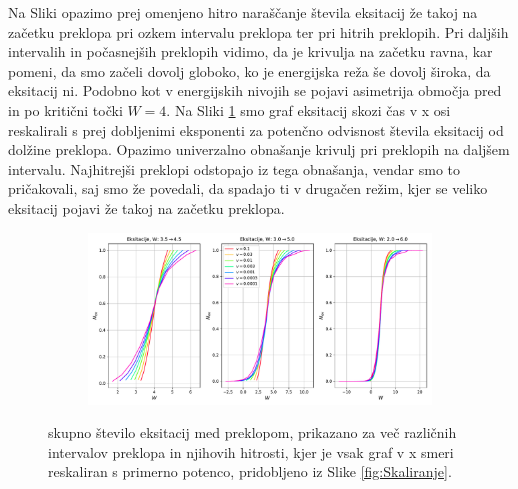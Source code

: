 Na Sliki \label{fig:SkoziCas} opazimo prej omenjeno hitro naraščanje števila eksitacij že takoj na začetku preklopa pri ozkem intervalu preklopa ter pri hitrih preklopih.
Pri daljših intervalih in počasnejših preklopih vidimo, da je krivulja na začetku ravna, kar pomeni, da smo začeli dovolj globoko, ko je energijska reža še dovolj široka, da eksitacij ni. Podobno kot v energijskih nivojih se pojavi asimetrija območja pred in po kritični točki $W=4$.
Na Sliki \ref{fig:SkoziCasAlt} smo graf eksitacij skozi čas v x osi reskalirali s prej dobljenimi eksponenti za potenčno odvisnost števila eksitacij od dolžine preklopa. Opazimo univerzalno obnašanje krivulj pri preklopih na daljšem intervalu. Najhitrejši preklopi odstopajo iz tega obnašanja, vendar smo to pričakovali, saj smo že povedali, da spadajo ti v drugačen režim, kjer se veliko eksitacij pojavi že takoj na začetku preklopa.
\begin{figure}[H]
\centering
\begin{subfigure}{.99\textwidth}
\includegraphics[width=\linewidth]{Figures/SkoziCasAlt.pdf}
\end{subfigure}
\caption{skupno število eksitacij med preklopom, prikazano za več različnih intervalov preklopa in njihovih hitrosti, kjer je vsak graf v x smeri reskaliran s primerno potenco, pridobljeno iz Slike \ref{fig:Skaliranje}.}
\label{fig:SkoziCasAlt}
\end{figure}

